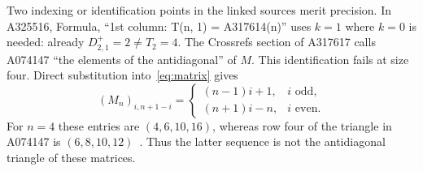 \documentclass[11pt]{article}
\begin{document}
Two indexing or identification points in the linked sources merit precision.
In A325516, Formula, ``1st column: T(n, 1) = A317614(n)''
uses $k=1$ where $k=0$ is needed:
already $D^+_{2,1}=2\ne T_2=4$.
The Crossrefs section of A317617 calls A074147 ``the elements of the
antidiagonal'' of $M$. This identification fails at size four.
Direct substitution into~\eqref{eq:matrix} gives
\begin{equation}\label{eq:anti}
(M_n)_{i,n+1-i}=\begin{cases}(n-1)i+1,&i\text{ odd},\\
(n+1)i-n,&i\text{ even}.
\end{cases}
\end{equation}
For $n=4$ these entries are $(4,6,10,16)$, whereas row four of the
triangle in A074147 is $(6,8,10,12)$~\cite{s074147}.
Thus the latter sequence is not the antidiagonal triangle of these matrices.
\end{document}
